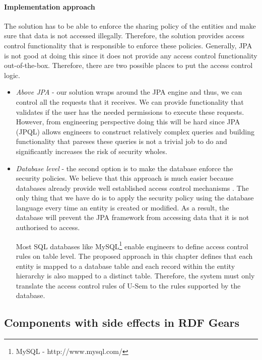 \paragraph{Implementation approach}

The solution has to be able to enforce the sharing policy of the entities and make sure that data is not accessed illegally. Therefore, the solution provides access control functionality that is responsible to enforce these policies. Generally, JPA is not good at doing this since it does not provide any access control functionality out-of-the-box. Therefore, there are two possible places to put the access control logic. 

\begin{itemize}
	\item \textit{Above JPA} - our solution wraps around the JPA engine and thus, we can control all the requests that it receives. We can provide functionality that validates if the user has the needed permissions to execute these requests. However, from engineering perspective doing this will be hard since JPA (JPQL) allows engineers to construct relatively complex queries and building functionality that pareses these queries is not a trivial job to do and significantly increases the risk of security wholes.
	
	\item \textit{Database level} - the second option is to make the database enforce the security policies. We believe that this approach is much easier because databases already provide well established access control mechanisms \cite{olson2008formal}. The only thing that we have do is to apply the security policy using the database language every time an entity is created or modified. As a result, the database will prevent the JPA framework from accessing data that it is not authorised to access.
	
	
Most SQL databases like MySQL\footnote{MySQL - http://www.mysql.com/} enable engineers to define access control rules on table level. The proposed approach in this chapter defines that each entity is mapped to a database table and each record within the entity hierarchy is also mapped to a distinct table. Therefore, the system must only translate the access control rules of U-Sem to the rules supported by the database.
\end{itemize}


\subsection{Components with side effects in RDF Gears}

